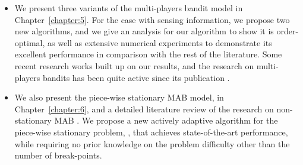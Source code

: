 \begin{itemize}

    \item
    We present three variants of the multi-players bandit model in Chapter~\ref{chapter:5}.
    For the case with sensing information, we propose two new algorithms, and we give an analysis for our algorithm \MCTopM{} to show it is order-optimal,
    as well as extensive numerical experiments to demonstrate its excellent performance in comparison with the rest of the literature.
    Some recent research works built up on our results, and the research on multi-players bandits has been quite active since its publication \cite{Besson2018ALT}.


    \item
    We also present the piece-wise stationary MAB model, in Chapter~\ref{chapter:6}, and a detailed literature review of the research on non-stationary MAB \cite{Besson2019GLRT,Besson2019Gretsi}.
    We propose a new actively adaptive algorithm for the piece-wise stationary problem, \GLRklUCB, that achieves state-of-the-art performance, while requiring no prior knowledge on the problem difficulty other than the number of break-points.

\end{itemize}


